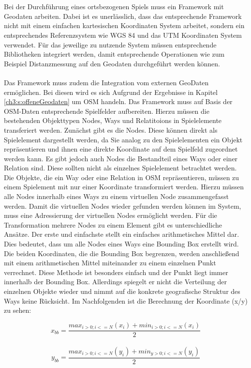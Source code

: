 \\\\
Bei der Durchführung eines ortsbezogenen Spiels muss ein Framework mit Geodaten arbeiten.
Dabei ist es unerlässlich, dass das entsprechende Framework nicht mit einem einfachen kartesischen Koordinaten System arbeitet, sondern ein entsprechendes Referenzsystem wie WGS 84 \cite{Grafarend.1998} und das UTM Koordinaten System \cite{Grafarend.1995} verwendet.
Für das jeweilige zu nutzende System müssen entsprechende Bibliotheken integriert werden, damit entsprechende Operationen wie zum Beispiel Distanzmessung auf den Geodaten durchgeführt werden können.
\\\\
Das Framework muss zudem die Integration vom externen GeoDaten ermöglichen. Bei diesen wird es sich Aufgrund der Ergebnisse in Kapitel \ref{ch3:s:offeneGeodaten} um OSM handeln. Das Framework muss auf Basis der OSM-Daten entsprechende Spielfelder aufbereiten. Hierzu müssen die bestehenden Objekttypen Nodes, Ways und Relatitoions in Spielelemente transferiert werden.
Zunächst gibt es die Nodes. Diese können direkt als Spielelement dargestellt werden, da Sie analog zu den Spielelementen ein Objekt repräsentieren und ihnen eine direkte Koordinate auf dem Spielfeld zugeordnet werden kann. Es gibt jedoch auch Nodes die Bestandteil eines Ways oder einer Relation sind. Diese sollten nicht als einzelnes Spielelement betrachtet werden.
Die Objekte, die ein Way oder eine Relation in OSM repräsentieren, müssen zu einem Spielement mit nur einer Koordinate transformiert werden. Hierzu müssen alle Nodes innerhalb eines Ways zu einem \glqq virtuellen\grqq{} Node zusammengefasst werden.
Damit die virtuellen Nodes wieder gefunden werden können im System, muss eine Adressierung der virtuellen Nodes ermöglicht werden.
Für die Transformation mehrere Nodes zu einem Element gibt es unterschiedliche Ansätze. Der erste und einfachste stellt ein einfaches arithmetisches Mittel dar. Dies bedeutet, dass um alle Nodes eines Ways eine Bounding Box erstellt wird. Die beiden Koordinaten, die die Bounding Box begrenzen, werden anschließend mit einem arithmetischen Mittel miteinander zu einem einzelnen Punkt verrechnet. Diese Methode ist besonders einfach und der Punkt liegt immer innerhalb der Bounding Box. Allerdings spiegelt er nicht die Verteilung der einzelnen Objekte wieder und nimmt auf die konkrete geografische Struktur des Ways keine Rücksicht. Im Nachfolgenden ist die Berechnung der Koordinate (x/y) zu sehen:

\begin{equation}
x_{bb} = \frac{max_{i>0; i<=N}(x_i) + min_{i>0; i<=N}(x_i)}{2}
\end{equation}
\\
\begin{equation}
y_{bb} = \frac{max_{i>0; i<=N}(y_i) + min_{y>0; i<=N}(y_i)}{2}
\end{equation}


